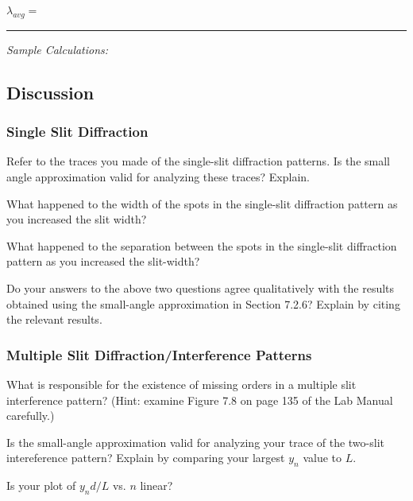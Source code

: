 \begin{center}
$\lambda _{avg}=$~ \rule{3cm}{.1mm} 
\end{center}
\vspace*{.5cm}

\noindent
{\it Sample Calculations:}

\newpage

\subsection{Discussion}
\subsubsection{Single Slit Diffraction}
Refer to the traces you made of the single-slit diffraction patterns.
Is the small angle approximation valid for analyzing these traces? Explain.
\vspace*{1cm}

\noindent 
What happened to the width of the spots in the single-slit diffraction pattern as you
increased the slit width?
\vspace*{.5cm}

\noindent
What happened to the separation between the spots in the single-slit diffraction
pattern as you increased the slit-width?
\vspace*{.5cm}

\noindent
Do your answers to the above two questions agree qualitatively with the results
obtained using the small-angle approximation in Section 7.2.6? Explain by citing the
relevant results.
\vspace*{2cm}

\subsubsection{Multiple Slit Diffraction/Interference Patterns}
What is responsible for the existence of missing orders in a multiple slit
interference pattern? (Hint: examine Figure 7.8 on page 135 of the Lab Manual 
carefully.)
\vspace*{1.4cm}

\noindent
Is the small-angle approximation valid for analyzing your trace of the two-slit
intereference pattern? Explain by comparing your largest $y_n$ value to $L.$
\vspace*{1cm}

\noindent
Is your plot of $y_nd/L$ vs. $n$ linear?
\vspace*{.3cm}

